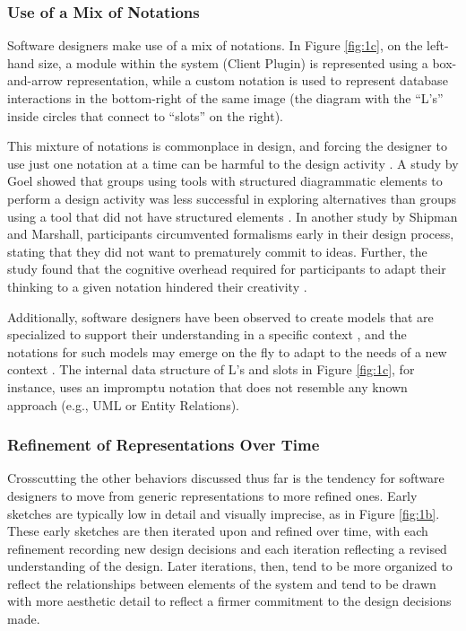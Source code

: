 \subsubsection{Use of a Mix of Notations}
\label{behaviorsofsoftwaredesignerswhilesketching:3}

Software designers make use of a mix of notations. In Figure \ref{fig:1c}, on the left-hand size, a module within the system (Client Plugin) is represented using a box-and-arrow representation,  while a custom notation is used to represent database interactions in the bottom-right of the same image (the diagram with the ``L's'' inside circles that connect to ``slots'' on the right). 

This mixture of notations is commonplace in design, and forcing the designer to use just one notation at a time can be harmful to the design activity \citep{Goel,Yatani}. A study by Goel showed that groups using tools with structured diagrammatic elements to perform a design activity was less successful in exploring alternatives than groups using a tool that did not have structured elements \citep{Goel}. In another study by Shipman and Marshall, participants circumvented formalisms early in their design process, stating that they did not want to prematurely commit to ideas. Further, the study found that the cognitive overhead required for participants to adapt their thinking to a given notation hindered their creativity \citep{Shipman}.

Additionally, software designers have been observed to create models that are specialized to support their understanding in a specific context \citep{petre2009insights}, and the notations for such models may emerge on the fly to adapt to the needs of a new context \citep{dekel2007notation}. The internal data structure of L's and slots in Figure \ref{fig:1c}, for instance, uses an impromptu notation that does not resemble any known approach (e.g., UML or Entity Relations).

\subsubsection{Refinement of Representations Over Time}
\label{behaviorsofsoftwaredesignerswhilesketching:4}

Crosscutting the other behaviors discussed thus far is the tendency for software designers to move from generic representations to more refined ones. Early sketches are typically low in detail and visually imprecise, as in Figure \ref{fig:1b}. These early sketches are then iterated upon and refined over time, with each refinement recording new design decisions and each iteration reflecting a revised understanding of the design. Later iterations, then, tend to be more organized to reflect the relationships between elements of the system and tend to be drawn with more aesthetic detail to reflect a firmer commitment to the design decisions made.

